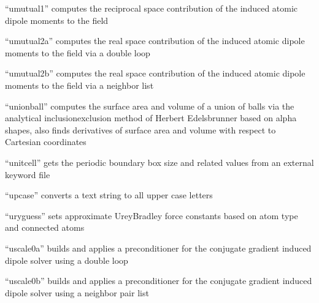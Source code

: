 \documentclass[letterpaper,11pt,english]{sphinxmanual}
\begin{document}
\sphinxAtStartPar
{}

\sphinxAtStartPar
“umutual1” computes the reciprocal space contribution of the induced atomic dipole moments to the field

\sphinxAtStartPar
{}

\sphinxAtStartPar
“umutual2a” computes the real space contribution of the induced atomic dipole moments to the field via a double loop

\sphinxAtStartPar
{}

\sphinxAtStartPar
“umutual2b” computes the real space contribution of the induced atomic dipole moments to the field via a neighbor list

\sphinxAtStartPar
{}

\sphinxAtStartPar
“unionball” computes the surface area and volume of a union of balls via the analytical inclusion\sphinxhyphen{}exclusion method of Herbert Edelsbrunner based on alpha shapes, also finds derivatives of surface area and volume with respect to Cartesian coordinates

\sphinxAtStartPar
{}

\sphinxAtStartPar
“unitcell” gets the periodic boundary box size and related values from an external keyword file

\sphinxAtStartPar
{}

\sphinxAtStartPar
“upcase” converts a text string to all upper case letters

\sphinxAtStartPar
{}

\sphinxAtStartPar
“uryguess” sets approximate Urey\sphinxhyphen{}Bradley force constants based on atom type and connected atoms

\sphinxAtStartPar
{}

\sphinxAtStartPar
“uscale0a” builds and applies a preconditioner for the conjugate gradient induced dipole solver using a double loop

\sphinxAtStartPar
{}

\sphinxAtStartPar
“uscale0b” builds and applies a preconditioner for the conjugate gradient induced dipole solver using a neighbor pair list

\sphinxAtStartPar
{}
\end{document}
